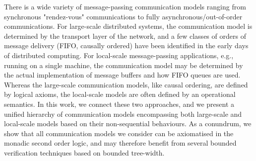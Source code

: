 There is a wide variety of message-passing communication models ranging from synchronous "rendez-vous" 
communications to fully asynchronous/out-of-order communications. For large-scale distributed systems, the
communication model is determined by the transport layer of the network, and a few classes of 
orders of message delivery (FIFO, causally ordered) have been identified in the early days of 
distributed computing. For local-scale message-passing applications, 
e.g., running on a single machine, the communication model may be determined by the actual implementation of 
message buffers and how FIFO queues are used. Whereas the large-scale communication
models, like causal ordering, are defined by logical axioms, the local-scale models are often defined by an operational
semantics. In this work, we connect these two approaches, and we present a unified hierarchy of communication
models encompassing both large-scale and local-scale models based on their non-sequential behaviours.
As a conundrum, we show that all communication models we consider can be axiomatised in the monadic second order logic,
and may therefore benefit from several bounded verification techniques based on bounded tree-width.